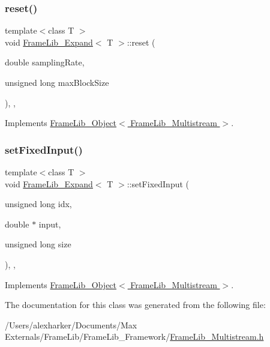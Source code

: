 \subsubsection{\texorpdfstring{reset()}{reset()}}
{\footnotesize\ttfamily template$<$class T $>$ \\
void \hyperlink{class_frame_lib___expand}{Frame\+Lib\+\_\+\+Expand}$<$ T $>$\+::reset (\begin{DoxyParamCaption}\item[{double}]{sampling\+Rate,  }\item[{unsigned long}]{max\+Block\+Size }\end{DoxyParamCaption})\hspace{0.3cm}{\ttfamily [inline]}, {\ttfamily [override]}, {\ttfamily [virtual]}}



Implements \hyperlink{class_frame_lib___object_aeb02311ab422dd569aeb982e31a66893}{Frame\+Lib\+\_\+\+Object$<$ Frame\+Lib\+\_\+\+Multistream $>$}.

\mbox{\label{class_frame_lib___expand_ae7e72800c3b52698383e333885921ce4}} 
\subsubsection{\texorpdfstring{set\+Fixed\+Input()}{setFixedInput()}}
{\footnotesize\ttfamily template$<$class T $>$ \\
void \hyperlink{class_frame_lib___expand}{Frame\+Lib\+\_\+\+Expand}$<$ T $>$\+::set\+Fixed\+Input (\begin{DoxyParamCaption}\item[{unsigned long}]{idx,  }\item[{double $\ast$}]{input,  }\item[{unsigned long}]{size }\end{DoxyParamCaption})\hspace{0.3cm}{\ttfamily [inline]}, {\ttfamily [override]}, {\ttfamily [virtual]}}



Implements \hyperlink{class_frame_lib___object_a0d3bed42a21ebf248366f4457722beff}{Frame\+Lib\+\_\+\+Object$<$ Frame\+Lib\+\_\+\+Multistream $>$}.



The documentation for this class was generated from the following file\+:\begin{DoxyCompactItemize}
\item 
/\+Users/alexharker/\+Documents/\+Max Externals/\+Frame\+Lib/\+Frame\+Lib\+\_\+\+Framework/\hyperlink{_frame_lib___multistream_8h}{Frame\+Lib\+\_\+\+Multistream.\+h}\end{DoxyCompactItemize}
